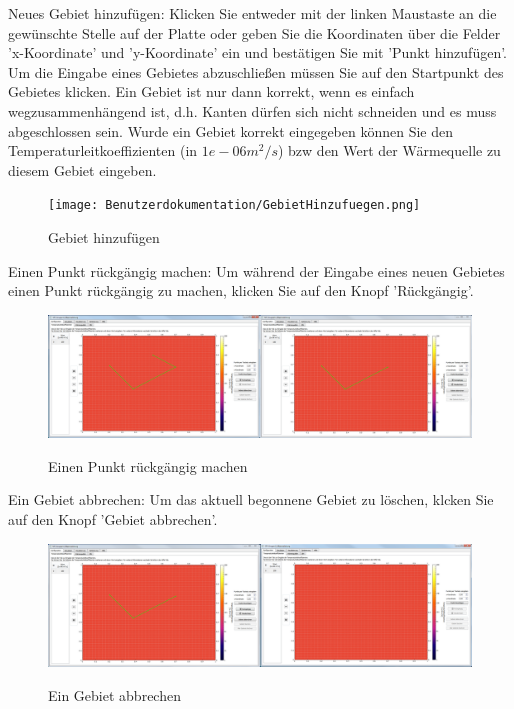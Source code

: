 \noindent
Neues Gebiet hinzufügen:
Klicken Sie entweder mit der linken Maustaste an die gewünschte Stelle auf der Platte oder geben Sie die Koordinaten über die Felder 'x-Koordinate' und 'y-Koordinate' ein und bestätigen Sie mit 'Punkt hinzufügen'. Um die Eingabe eines Gebietes abzuschließen müssen Sie auf den Startpunkt des Gebietes klicken. Ein Gebiet ist nur dann korrekt, wenn es einfach wegzusammenhängend ist, d.h. Kanten dürfen sich nicht schneiden und es muss abgeschlossen sein. Wurde ein Gebiet korrekt eingegeben können Sie den Temperaturleitkoeffizienten (in $1e-06 m^2/s$) bzw den Wert der Wärmequelle zu diesem Gebiet eingeben.
\begin{figure}[H]
\centering
\texttt{[image: Benutzerdokumentation/GebietHinzufuegen.png]}\\
\caption{Gebiet hinzufügen}
\label{Ein neues Gebiet hinzufügen}
\end{figure}

\newpage
\noindent
Einen Punkt rückgängig machen:
Um während der Eingabe eines neuen Gebietes einen Punkt rückgängig zu machen, klicken Sie auf den Knopf 'Rückgängig'.
\begin{figure}[H]
\centering
\includegraphics[scale=.25]{Benutzerdokumentation/PunktRueckgaengig.png}\\
\caption{Einen Punkt rückgängig machen}
\label{PunktRueckgaengig}
\end{figure}

\noindent
Ein Gebiet abbrechen: Um das aktuell begonnene Gebiet zu löschen, klcken Sie auf den Knopf 'Gebiet abbrechen'.
\begin{figure}[H]
\centering
\includegraphics[scale=.25]{Benutzerdokumentation/GebietAbbrechen.png}\\
\caption{Ein Gebiet abbrechen}
\label{GebietAbbrechen}
\end{figure}

